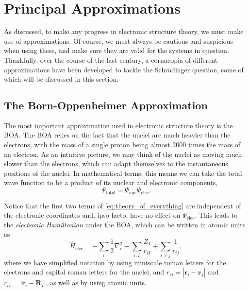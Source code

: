 \section{Principal Approximations}

As discussed, to make any progress in electronic structure theory, we must make use of approximations. Of course, we must always be cautious and suspicious when using these, and make sure they are valid for the systems in question. Thankfully, over the course of the last century, a cornucopia of different approximations have been developed to tackle the Schr\"odinger question, some of which will be discussed in this section.

\subsection{The Born-Oppenheimer Approximation}

The most important approximation used in electronic structure theory is the \gls{BOA}.\cite{bornZur1927} The \gls{BOA} relies on the fact that the nuclei are much heavier than the electrons, with the mass of a single proton being almost 2000 times the mass of an electron. As an intuitive picture, we may think of the nuclei as moving much slower than the electrons, which can adapt themselves to the instantaneous positions of the nuclei. In mathematical terms, this means we can take the total wave function to be a product of its nuclear and electronic components,
\begin{equation}
    \Psi_\mathrm{total} = \Psi_\mathrm{nuc} \Psi_\mathrm{elec}.
\end{equation}

Notice that the first two terms of \eqref{eq:theory_of_everything} are independent of the electronic coordinates and, ipso facto, have no effect on $\Psi_\mathrm{elec}$. This leads to the \emph{electronic Hamiltonian} under the \gls{BOA}, which can be written in atomic units as
\begin{equation}
\label{eq:elec_hamiltonian}
\hat H_\mathrm{elec} = -\sum_{i} \frac{1}{2} \nabla_i^2 - \sum_{i,I} \frac{Z_I}{r_{iI}} + \sum_{i\gt j} \frac{1}{r_{ij}},
\end{equation}
where we have simplified notation by using miniscule roman letters for the electrons and capital roman letters for the nuclei, and $r_{ij}=|\mathbf{r}_i-\mathbf{r}_j|$ and $r_{iI}=|\mathbf{r}_i-\mathbf{R}_I|$, as well as by using atomic units.

